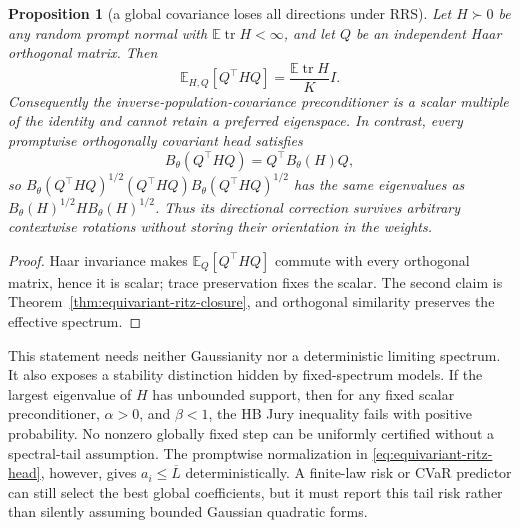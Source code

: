 \documentclass[11pt]{article}
\newtheorem{proposition}{Proposition}
\begin{document}
\begin{proposition}[a global covariance loses all directions under RRS]
\label{prop:rrs-global-covariance}
Let $H\succ0$ be any random prompt normal with
$\mathbb E\operatorname{tr}H<\infty$, and let $Q$ be an independent Haar
orthogonal matrix.  Then
\[
 \mathbb E_{H,Q}[Q^\top H Q]
 =\frac{\mathbb E\operatorname{tr}H}{K}I.
\]
Consequently the inverse-population-covariance preconditioner is a scalar
multiple of the identity and cannot retain a preferred eigenspace.  In
contrast, every promptwise orthogonally covariant head satisfies
\[
 B_\theta(Q^\top H Q)=Q^\top B_\theta(H)Q,
\]
so $B_\theta(Q^\top H Q)^{1/2}(Q^\top H Q)
B_\theta(Q^\top H Q)^{1/2}$ has the same eigenvalues as
$B_\theta(H)^{1/2}HB_\theta(H)^{1/2}$.  Thus its directional correction
survives arbitrary contextwise rotations without storing their orientation
in the weights.
\end{proposition}
\begin{proof}
Haar invariance makes $\mathbb E_Q[Q^\top H Q]$ commute with every orthogonal
matrix, hence it is scalar; trace preservation fixes the scalar.  The second
claim is Theorem~\ref{thm:equivariant-ritz-closure}, and orthogonal similarity
preserves the effective spectrum.
\end{proof}

This statement needs neither Gaussianity nor a deterministic limiting
spectrum.  It also exposes a stability distinction hidden by fixed-spectrum
models.  If the largest eigenvalue of $H$ has unbounded support, then for any
fixed scalar preconditioner, $\alpha>0$, and $\beta<1$, the HB Jury inequality
fails with positive probability.  No nonzero globally fixed step can be
uniformly certified without a spectral-tail assumption.  The promptwise
normalization in \eqref{eq:equivariant-ritz-head}, however, gives
$a_i\leq\overline L$ deterministically.  A finite-law risk or CVaR predictor
can still select the best global coefficients, but it must report this tail
risk rather than silently assuming bounded Gaussian quadratic forms.
\end{document}
